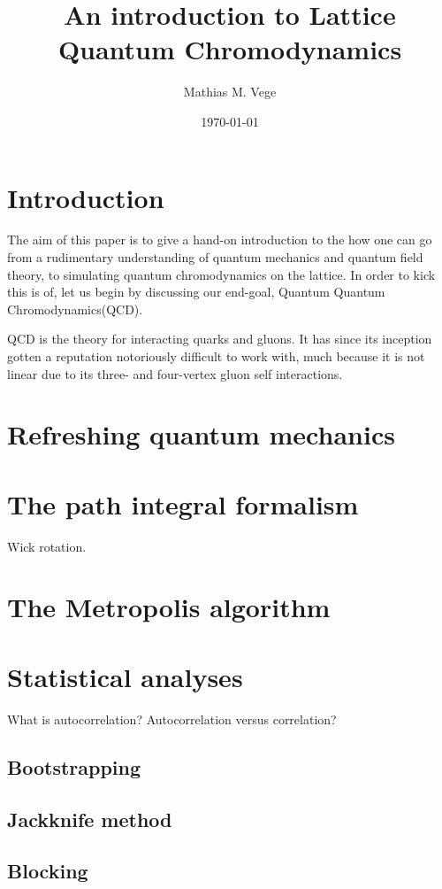 \documentclass[11pt]{article}
\title{An introduction to Lattice Quantum Chromodynamics}
\author{Mathias M. Vege}
\date{\today}
\begin{document}
\maketitle

\begin{abstract}

\end{abstract}


\section{Introduction}
The aim of this paper is to give a hand-on introduction to the how one can go from a rudimentary understanding of quantum mechanics and quantum field theory, to simulating quantum chromodynamics on the lattice. In order to kick this is of, let us begin by discussing our end-goal, Quantum Quantum Chromodynamics(QCD).

QCD is the theory for interacting quarks and gluons. It has since its inception gotten a reputation notoriously difficult to work with, much because it is not linear due to its three- and four-vertex gluon self interactions. 

\section{Refreshing quantum mechanics}
\section{The path integral formalism}
Wick rotation.
\section{The Metropolis algorithm}
\section{Statistical analyses}
What is autocorrelation? Autocorrelation versus correlation?
\subsection{Bootstrapping}
\subsection{Jackknife method}
\subsection{Blocking}
\end{document}
